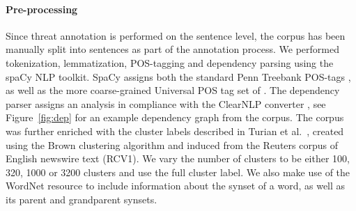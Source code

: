 \documentclass[11pt,letterpaper]{article}
\let\tag=\textsc
\begin{document}
\paragraph{Pre-processing}Since threat annotation is performed on the sentence level, the corpus has been manually split into sentences as part of the annotation process.  We performed tokenization, lemmatization, POS-tagging and dependency parsing using the spaCy NLP toolkit. SpaCy assigns both the standard Penn Treebank POS-tags \cite{Mar:San:Mar:93}, as well as the more coarse-grained Universal POS tag set of . The dependency parser assigns an analysis in compliance with the ClearNLP converter \cite{Cho:Pal:12}, see Figure~\ref{fig:dep} for an example dependency graph from the corpus. The corpus was further enriched with the cluster labels described in Turian et al.~, created using the Brown clustering algorithm \cite{Bro:deS:Mer:92} and induced from the Reuters corpus of English newswire text (RCV1).
We vary the number of clusters to be either 100, 320, 1000 or 3200 clusters and use the full cluster label.  We also make use of the WordNet resource \cite{wordnet} to include information about the synset of a word, as well as its parent and grandparent synsets.

\end{document}
